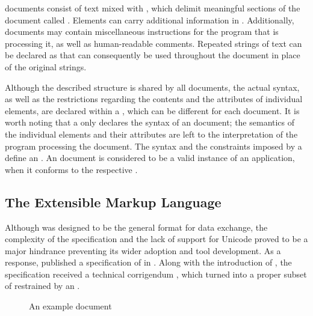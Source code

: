 \documentclass[
  a5paper,10pt,           %
  dvipsnames              %
]{book}
\begin{document}
 documents consist of text mixed with %
, which delimit meaningful sections of the document called
. Elements can carry additional
information in . Additionally,
 documents may contain miscellaneous instructions for the program
that is processing it, as well as human-readable comments. Repeated strings of
text can be declared as  
that can consequently be used throughout the document in place of the original
strings.

Although the described structure is shared by all  documents, the
actual syntax, as well as the restrictions regarding the contents and the
attributes of individual elements, are declared within a , which
can be different for each document. It is worth noting that a  only
declares the syntax of an  document; the semantics of the
individual elements and their attributes are left to the interpretation of the
program processing the document. The syntax and the constraints imposed by a
 define an %
. An  document is considered to be a
valid instance of an  application, when it conforms to the
respective .

\subsection{The Extensible Markup Language}
Although  was designed to be the general format for data exchange,
the complexity of the specification and the lack of support for Unicode proved
to be a major hindrance preventing its wider adoption and tool development. As a
response,  published a specification of  in
\citeyear{bray98}. Along with the introduction of , the
 specification received a technical corrigendum
\cite{goldfarb97:webSGML}, which turned  into a proper subset of
 restrained by an  .

\begin{figure}
  \caption{An example  document}
  \label{fig:recipe}\bigskip
\end{figure}
\end{document}
